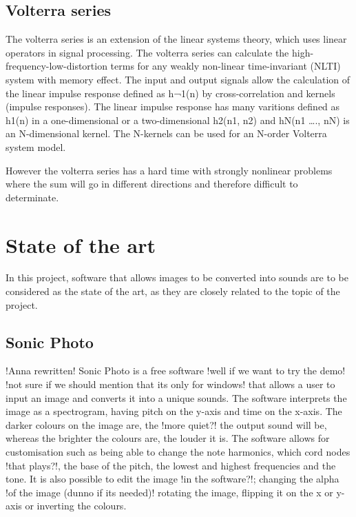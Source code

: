 \subsection{Volterra series}\label{sub:Volt}

The volterra series is an extension of the linear systems theory, which uses linear operators in signal processing. The volterra series can calculate the high-frequency-low-distortion terms for any weakly non-linear time-invariant (NLTI) system with memory effect.  The input and output signals allow the calculation of the linear impulse response defined as h¬1(n) by cross-correlation and kernels (impulse responses). The linear impulse response has many varitions defined as h1(n) in a one-dimensional or a two-dimensional h2(n1, n2) and hN(n1 …., nN) is an N-dimensional kernel. The N-kernels can be used for an N-order Volterra system model. 


However the volterra series has a hard time with strongly nonlinear problems where the sum will go in different directions and therefore difficult to determinate. 


\section{State of the art}\label{sec:stateart}
In this project, software that allows images to be converted into sounds are to be considered as the state of the art, as they are closely related to the topic of the project.

\subsection{Sonic Photo}\label{sub:sonic}
!Anna rewritten!
Sonic Photo \cite{White2013} is a free software !well if we want to try the demo! !not sure if we should mention that its only for windows! that allows a user to input an image and converts it into a unique sounds. The software interprets the image as a spectrogram, having pitch on the y-axis and time on the x-axis. 
The darker colours on the image are, the !more quiet?! the output sound will be, whereas the brighter the colours are, the louder it is. The software allows for customisation such as being able to change the note harmonics, which cord nodes !that plays?!, the base of the pitch, the lowest and highest frequencies and the tone. It is also possible to edit the image !in the software?!; changing the alpha !of the image (dunno if its needed)! rotating the image, flipping it on the x or y-axis or inverting the colours. 

